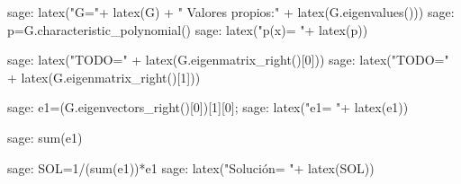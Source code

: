 \begin{sagecommandline}
    sage: latex("G="+ latex(G) + " Valores propios:" + latex(G.eigenvalues()))
    sage: p=G.characteristic_polynomial()
    sage: latex("p(x)=  "+ latex(p))
\end{sagecommandline}
    
\begin{sagecommandline}
    sage: latex("TODO=" + latex(G.eigenmatrix_right()[0]))
    sage: latex("TODO=" + latex(G.eigenmatrix_right()[1]))
\end{sagecommandline}
    
\begin{sagecommandline}
    sage: e1=(G.eigenvectors_right()[0])[1][0];
    sage: latex("e1=  "+ latex(e1))
\end{sagecommandline}
    
\begin{sagecommandline}
    sage: sum(e1)
\end{sagecommandline}
    
\begin{sagecommandline}
    sage: SOL=1/(sum(e1))*e1
    sage: latex("Solución=  "+ latex(SOL))
\end{sagecommandline}